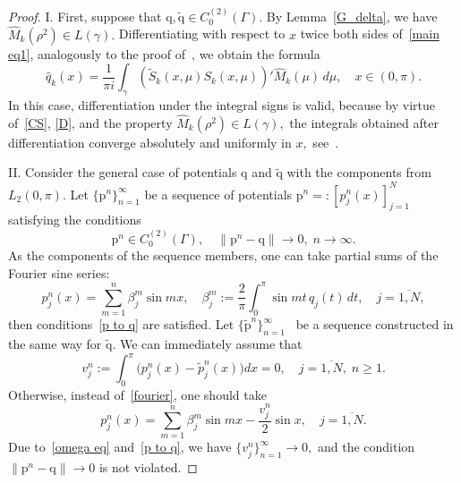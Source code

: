 \documentclass[a4paper, 12pt] {article}
\theoremstyle{plain}
\theoremstyle{remark}
\theoremstyle{plain}
\theoremstyle{definition}
\numberwithin{equation}{section}
\begin{document}
\begin{proof}
I. First, suppose that $\mathrm{q}, \mathrm{\tilde q} \in C_0^{(2)}(\Gamma).$ By Lemma~\ref{G_delta}, we have $\hat M_k(\rho^2) \in L(\gamma).$ Differentiating with respect to $x$ twice both sides of~\eqref{main eq1}, analogously to the proof of~\cite[lemma~1.6.5]{freil}, we obtain the formula
\begin{equation*} \label{C formula}
\hat q_k(x) = \frac{1}{\pi i} \mathop{\int}_{\gamma} (\tilde S_k(x, \mu) S_k(x, \mu))' \hat M_k(\mu) \, d\mu, \quad x \in (0, \pi).
\end{equation*}
In this case, differentiation under the integral signs is valid, because by virtue of~\eqref{CS}, \eqref{D}, and the property $\hat M_k(\rho^2) \in L(\gamma),$ the integrals obtained after differentiation converge absolutely and uniformly in $x,$ see~\cite[\S7.1.5]{podkorytov}.

 II. Consider the general case of potentials $\mathrm{q}$ and $\mathrm{\tilde q}$ with the components from $L_2(0, \pi).$
Let $\{ {\mathrm p}^n\}_{n=1}^\infty$ be a sequence of potentials $\mathrm{p}^n =: [p_j^n(x)]_{j=1}^N$ satisfying the conditions
\begin{equation} \label{p to q}
\mathrm{p}^n \in C^{(2)}_0(\Gamma),\quad
\| \mathrm{p}^n - \mathrm{q}\| \to 0, \; n \to \infty.
\end{equation}
As the components of the sequence members, one can take
partial sums of the Fourier sine series:
\begin{equation} \label{fourier}
p^n_j(x) = \sum_{m=1}^n \beta_j^m \sin mx , \quad \beta_j^m := \frac{2}{\pi} \int_0^\pi \sin mt \, q_j(t)\,dt, \quad j = \overline{1, N},
\end{equation}
then conditions~\eqref{p to q}  are satisfied.
Let $\{ \mathrm{ \tilde p}^n\}_{n=1}^\infty$~ be a sequence constructed in the same way for $\tilde{\mathrm q}.$
We can immediately assume that
$$v_{j}^n := \int_0^\pi \big({p}^n_j(x) - \tilde{p}^n_j(x)\big) dx = 0, \quad j = \overline{1, N}, \; n \ge 1.$$
Otherwise, instead of~\eqref{fourier}, one should take
\begin{equation*}
p^n_j(x) = \sum_{m=1}^n \beta_j^m \sin mx - \frac{ v_{j}^n}{2} \sin x, \quad j = \overline{1, N}.
\end{equation*}
Due to~\eqref{omega eq} and~\eqref{p to q}, we have $\{ v_j^n\}_{n=1}^\infty \to 0,$ and the condition $\| \mathrm{p}^n - \mathrm{q}\| \to 0$ is not violated.


\end{proof}
\end{document}
